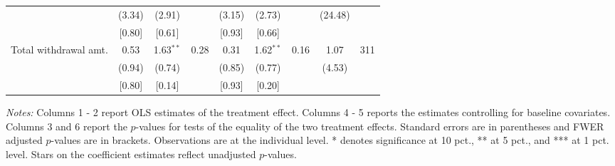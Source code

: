 \begin{table}[htbp]
{\begin{threeparttable}
\begin{tabular}{l*{8}{c}}
          &   (3.34)&   (2.91)&         &   (3.15)&   (2.73)&         &  (24.48)&         \\
          &   [0.80]&   [0.61]&         &   [0.93]&   [0.66]&         &         &         \\
Total withdrawal amt.&     0.53&1.63$^{**}$&     0.28&     0.31&1.62$^{**}$&     0.16&     1.07&      311\\
          &   (0.94)&   (0.74)&         &   (0.85)&   (0.77)&         &   (4.53)&         \\
          &   [0.80]&   [0.14]&         &   [0.93]&   [0.20]&         &         &         \\
\bottomrule \end{tabular} \begin{tablenotes}[flushleft] \footnotesize \item \emph{Notes:} Columns 1 - 2 report OLS estimates of the treatment effect. Columns 4 - 5 reports the estimates controlling for baseline covariates. Columns 3 and 6 report the \(p\)-values for tests of the equality of the two treatment effects. Standard errors are in parentheses and FWER adjusted \(p\)-values are in brackets. Observations are at the individual level. * denotes significance at 10 pct., ** at 5 pct., and *** at 1 pct. level. Stars on the coefficient estimates reflect unadjusted \(p\)-values. \end{tablenotes} \end{threeparttable} } \end{table}

